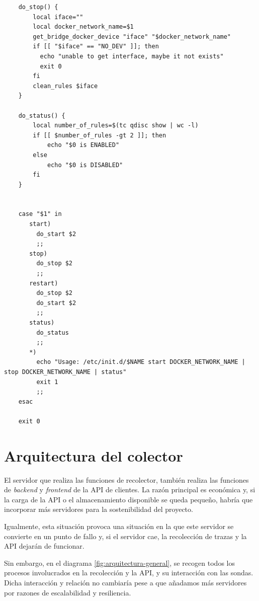 \begin{verbatim}
    do_stop() {
        local iface=""
        local docker_network_name=$1
        get_bridge_docker_device "iface" "$docker_network_name"
        if [[ "$iface" == "NO_DEV" ]]; then
          echo "unable to get interface, maybe it not exists"
          exit 0
        fi
        clean_rules $iface
    }
    
    do_status() {
        local number_of_rules=$(tc qdisc show | wc -l)
        if [[ $number_of_rules -gt 2 ]]; then
            echo "$0 is ENABLED"
        else
            echo "$0 is DISABLED"
        fi
    }
    
    
    case "$1" in
       start)
         do_start $2
         ;;
       stop)
         do_stop $2
         ;;
       restart)
         do_stop $2
         do_start $2
         ;;
       status)
         do_status
         ;;
       *)
         echo "Usage: /etc/init.d/$NAME start DOCKER_NETWORK_NAME | stop DOCKER_NETWORK_NAME | status"
         exit 1
         ;;
    esac
    
    exit 0    
\end{verbatim}
\bigskip


\section{Arquitectura del colector}

El servidor que realiza las funciones de recolector, también realiza las funciones
de \emph{backend} y \emph{frontend} de la API de clientes. La razón principal
es económica y, si la carga de la API o el almacenamiento disponible se queda pequeño,
habría que incorporar más servidores para la sostenibilidad del proyecto.

Igualmente, esta situación provoca una situación en la que este servidor se convierte en un 
punto de fallo y, si el servidor cae, la recolección de trazas y la API dejarán de funcionar.

Sin embargo, en el diagrama \ref{fig:arquitectura-general}, se recogen todos los procesos involucrados
en la recolección y la API, y su interacción con las sondas. Dicha interacción y relación no cambiaría pese
a que añadamos más servidores por razones de escalabilidad y resiliencia.

